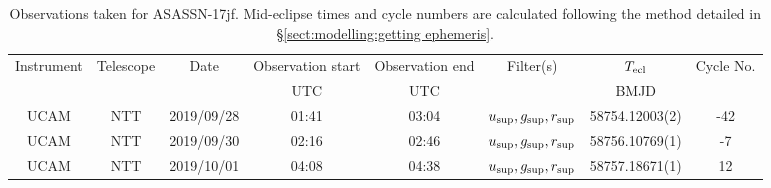 \begin{table}
	\begin{center}
		\caption{Observations taken for ASASSN-17jf. Mid-eclipse times and cycle numbers are calculated following the method detailed in \S\ref{sect:modelling:getting ephemeris}.}
		\label{table:observing:observation logs ASASSN-17jf}
		\begin{tabular}{cccccccc}
			\hline
			Instrument & Telescope & Date & Observation start & Observation end & Filter(s) & $T_{\rm ecl}$ & Cycle No. \\
			 &  &  & UTC & UTC &  & BMJD &  \\
			\hline
			\hline
			UCAM & NTT & 2019/09/28 & 01:41 & 03:04 & $u_{\rm sup},g_{\rm sup},r_{\rm sup}$ & 58754.12003(2)                                                                                                            &                                         -42 \\
			UCAM & NTT & 2019/09/30 & 02:16 & 02:46 & $u_{\rm sup},g_{\rm sup},r_{\rm sup}$ & 58756.10769(1)                                                                                                            &                                          -7 \\
			UCAM & NTT & 2019/10/01 & 04:08 & 04:38 & $u_{\rm sup},g_{\rm sup},r_{\rm sup}$ & 58757.18671(1)                                                                                                            &                                          12 \\
		   \hline
		\end{tabular}
	\end{center}
\end{table}